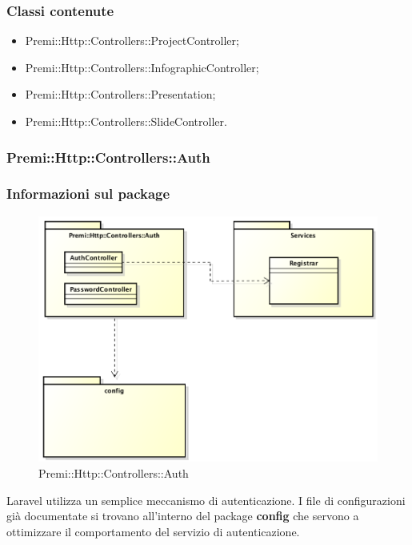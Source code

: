 	\subsubsection*{Classi contenute}
		\begin{itemize}
			\item Premi::Http::Controllers::ProjectController;
			\item Premi::Http::Controllers::InfographicController;
			\item Premi::Http::Controllers::Presentation;
			\item Premi::Http::Controllers::SlideController.
		\end{itemize}
		
	
	\subsubsection*{Premi::Http::Controllers::Auth}
		\subsubsection*{Informazioni sul package}
		\begin{figure}[h]
			\centering
			\includegraphics[width=0.9\linewidth]{img/premi_http_controllers_auth}
			\caption[Premi::Http::Controllers::Auth]{Premi::Http::Controllers::Auth}
			\label{fig:premi_http_controllers_auth}
		\end{figure}
	Laravel utilizza un semplice meccanismo di autenticazione. I file di configurazioni già documentate si trovano all'interno del package \textbf{config} che servono a ottimizzare il comportamento del servizio di autenticazione.		
